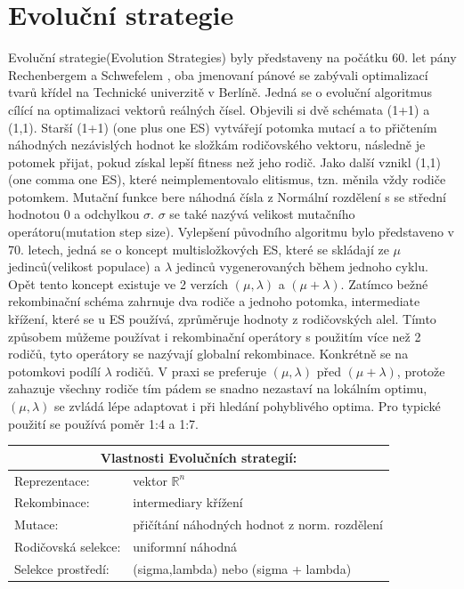 \section{Evoluční strategie}
Evoluční strategie(Evolution Strategies) byly představeny na počátku 60. let pány Rechenbergem a Schwefelem \cite{Beyer2002}, oba jmenovaní pánové se zabývali optimalizací tvarů křídel na Technické univerzitě v Berlíně. Jedná se o evoluční algoritmus cílící na optimalizaci vektorů reálných čísel. Objevili si dvě schémata (1+1) a (1,1). Starší (1+1) (one plus one ES) vytvářejí potomka mutací a to přičtením náhodných nezávislých hodnot ke složkám rodičovského vektoru, následně je potomek přijat, pokud získal lepší fitness než jeho rodič. Jako další vznikl (1,1) (one comma one ES), které neimplementovalo elitismus, tzn. měnila vždy rodiče potomkem. Mutační funkce bere náhodná čísla z Normální rozdělení s se střední hodnotou 0 a odchylkou $\sigma$. $\sigma$ se také nazývá velikost mutačního operátoru(mutation step size). Vylepšení původního algoritmu bylo představeno v 70. letech, jedná se o koncept multisložkových ES, které se skládají ze $\mu$ jedinců(velikost populace) a $\lambda$ jedinců vygenerovaných během jednoho cyklu. Opět tento koncept existuje ve 2 verzích $(\mu,\lambda)$ a $(\mu + \lambda)$. Zatímco bežné rekombinační schéma zahrnuje dva rodiče a jednoho potomka, intermediate křížení, které se u ES používá, zprůměruje hodnoty z rodičovských alel. Tímto způsobem můžeme používat i rekombinační operátory s použitím více než 2 rodičů, tyto operátory se nazývají globalní rekombinace. Konkrétně se na potomkovi podílí $\lambda$ rodičů. V praxi se preferuje $(\mu,\lambda)$ před $(\mu + \lambda)$, protože zahazuje všechny rodiče tím pádem se snadno nezastaví na lokálním optimu, $(\mu,\lambda)$ se zvládá lépe adaptovat i při hledání pohyblivého optima. Pro typické použití se používá poměr 1:4 a 1:7. 
\begin{center}
  \begin{tabular}{ l l }
      \multicolumn{2}{c}{Vlastnosti Evolučních strategií:} \\
      \hline \hline
      Reprezentace: & vektor $\mathbb{R}^n$ \\
      \hline  
      Rekombinace: & intermediary křížení \\
      \hline  
      Mutace: & přičítání náhodných hodnot z norm. rozdělení \\
      \hline   
      Rodičovská selekce: & uniformní náhodná \\
      \hline   
      Selekce prostředí: & (sigma,lambda) nebo (sigma + lambda) \\
    \end{tabular} 
  \end{center} \par
